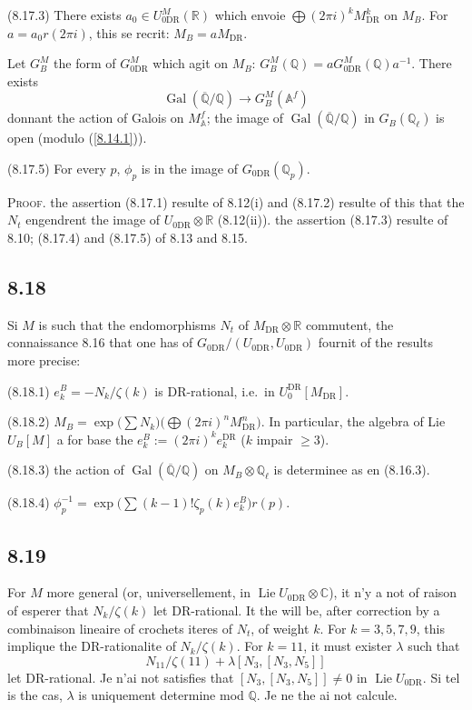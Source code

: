 \documentclass[12pt,a4paper]{article}
\theoremstyle{plain}
\theoremstyle{definition}
\theoremstyle{remark}
\DeclareMathOperator{\Lie}{Lie}
\DeclareMathOperator{\Gal}{Gal}
\newcommand{\Q}{\mathbb{Q}}
\newcommand{\C}{\mathbb{C}}
\newcommand{\R}{\mathbb{R}}
\newcommand{\Af}{\mathbb{A}^f}
\newcommand{\DR}{\mathrm{DR}}
\begin{document}
(8.17.3) There exists $a_0 \in U_{0\DR}^M(\R)$ which envoie $\bigoplus (2\pi i)^k M_{\DR}^k$ on $M_B$. For $a = a_0 r(2\pi i)$, this se recrit: $M_B = a M_{\DR}$.

Let $G_B^M$ the form of $G_{0\DR}^M$ which agit on $M_B$: $G_B^M(\Q) = a G_{0\DR}^M(\Q) a^{-1}$. There exists
\begin{equation}\label{8.17.4}
\Gal(\overline{\Q}/\Q) \longrightarrow G_B^M(\Af) \tag{8.17.4}
\end{equation}
donnant the action of Galois on $M_\Af$; the image of $\Gal(\overline{\Q}/\Q)$ in $G_B(\Q_\ell)$ is open (modulo (\ref{8.14.1})).

(8.17.5) For every $p$, $\phi_p$ is in the image of $G_{0\DR}(\Q_p)$.

\textsc{Proof.} the assertion (8.17.1) resulte of 8.12(i) and (8.17.2) resulte of this that the $N_t$ engendrent the image of $U_{0\DR} \otimes \R$ (8.12(ii)). the assertion (8.17.3) resulte of 8.10; (8.17.4) and (8.17.5) of 8.13 and 8.15.

\subsection*{8.18}

Si $M$ is such that the endomorphisms $N_t$ of $M_{\DR} \otimes \R$ commutent, the connaissance 8.16 that one has of $G_{0\DR}/(U_{0\DR}, U_{0\DR})$ fournit of the results more precise:

(8.18.1) $e_k^B = -N_k/\zeta(k)$ is DR-rational, i.e.~in $U_0^\DR[M_\DR]$.

(8.18.2) $M_B = \exp\big(\sum N_k\big)\big(\bigoplus (2\pi i)^n M_{\DR}^n\big)$. In particular, the algebra of Lie $U_B[M]$ a for base the $e_k^B := (2\pi i)^k e_k^\DR$ ($k$ impair $\geq 3$).

(8.18.3) the action of $\Gal(\overline{\Q}/\Q)$ on $M_B \otimes \Q_\ell$ is determinee as en (8.16.3).

(8.18.4) $\phi_p^{-1} = \exp\big(\sum (k-1)!\zeta_p(k) e_k^B\big) r(p)$.

\subsection*{8.19}

For $M$ more general (or, universellement, in $\Lie U_{0\DR} \otimes \C$), it n'y a not of raison of esperer that $N_k/\zeta(k)$ let DR-rational. It the will be, after correction by a combinaison lineaire of crochets iteres of $N_t$, of weight $k$. For $k = 3, 5, 7, 9$, this implique the DR-rationalite of $N_k/\zeta(k)$. For $k = 11$, it must exister $\lambda$ such that
$$N_{11}/\zeta(11) + \lambda [N_3, [N_3, N_5]]$$
let DR-rational. Je n'ai not satisfies that $[N_3, [N_3, N_5]] \neq 0$ in $\Lie U_{0\DR}$. Si tel is the cas, $\lambda$ is uniquement determine mod $\Q$. Je ne the ai not calcule.
\end{document}
